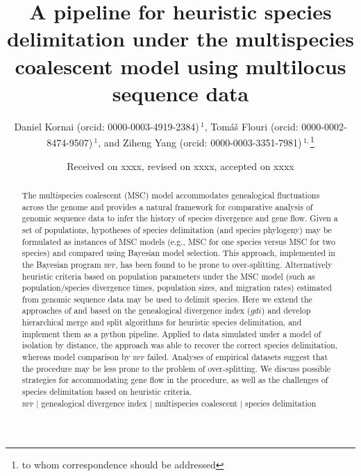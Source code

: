 \documentclass{article1}
\begin{document}
\title[Heuristic species delimitation] {A pipeline for heuristic species delimitation
   under the multispecies coalescent model using multilocus sequence data}

\author[Kornai \textit{et~al.}]%
{Daniel Kornai (orcid: 0000-0003-4919-2384)\,$^{1}$, Tom\'{a}\v{s} Flouri (orcid:
0000-0002-8474-9507)\,$^{1}$, and Ziheng Yang (orcid:
0000-0003-3351-7981)\,$^{1,}$\footnote{to whom correspondence should be addressed}}

\address{
	$^1$Department of Genetics, Evolution and Environment, University College London, UK
}

\date{Received on xxxx, revised on xxxx, accepted on xxxx}


\begin{abstract}
The multispecies coalescent (MSC) model accommodates genealogical fluctuations across the
genome and provides a natural framework for comparative analysis of genomic sequence data
to infer the history of species divergence and gene flow.  Given a set of populations,
hypotheses of species delimitation (and species phylogeny) may be formulated as instances
of MSC models (e.g., MSC for one species versus MSC for two species) and compared using
Bayesian model selection. This approach, implemented in the Bayesian program \textsc{bpp},
has been found to be prone to over-splitting. Alternatively heuristic criteria based on
population parameters under the MSC model (such as population/species divergence times,
population sizes, and migration rates) estimated from genomic sequence data may be used to
delimit species.  Here we extend the approaches of \cite{Jackson2017} and
\cite{Leache2019} based on the genealogical divergence index ($gdi$) and develop
hierarchical merge and split algorithms for heuristic species delimitation, and implement
them as a python pipeline.  Applied to data simulated under a model of isolation by
distance, the approach was able to recover the correct species delimitation, whereas model
comparison by \textsc{bpp} failed.  Analyses of empirical datasets suggest that the
procedure may be less prone to the problem of over-splitting.  We discuss possible
strategies for accommodating gene flow in the procedure, as well as the challenges of
species delimitation based on heuristic criteria. \\ %
\textsc{bpp} $|$ genealogical divergence index $|$ multispecies coalescent $|$ species
delimitation
\end{abstract}

\maketitle
\end{document}
